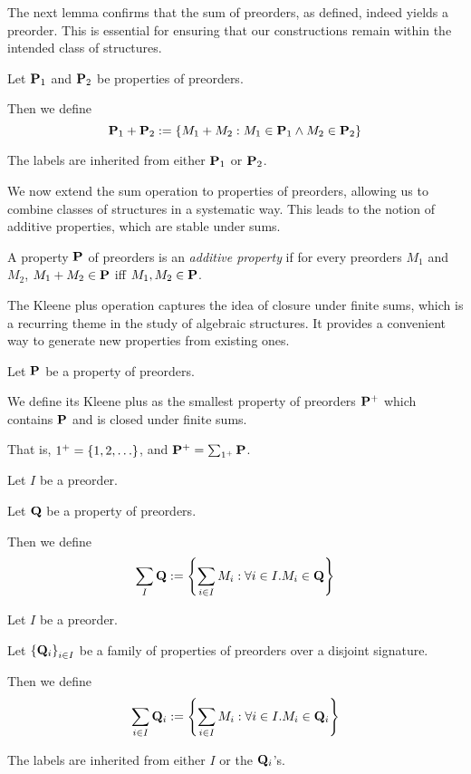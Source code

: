The next lemma confirms that the sum of preorders, as defined, indeed yields a preorder. This is essential for ensuring that our
constructions remain within the intended class of structures.

\begin{definition}
  Let $\mathbf{P}_1$ and $\mathbf{P}_2$ be properties of preorders.

  Then we define
  \[
    \mathbf{P}_1 + \mathbf{P}_2 := \left\{ {M_1 + M_2 : M_1 \in \mathbf{P}_1 \wedge M_2 \in \mathbf{P}_2} \right\}
  \]

  The labels are inherited from either $\mathbf{P}_1$ or $\mathbf{P}_2$.
\end{definition}

We now extend the sum operation to properties of preorders, allowing us to combine classes of structures in a systematic way.
This leads to the notion of additive properties, which are stable under sums.

\begin{definition}
  A property $\mathbf{P}$ of preorders is an \emph{additive property} if for every preorders $M_1$ and $M_2$,
  $M_1 + M_2 \in \mathbf{P}$ iff $M_1, M_2 \in \mathbf{P}$.
\end{definition}

The Kleene plus operation captures the idea of closure under finite sums, which is a recurring theme in the study of algebraic
structures. It provides a convenient way to generate new properties from existing ones.

\begin{definition}
  Let $\mathbf{P}$ be a property of preorders.

  We define its Kleene plus as the smallest property of preorders $\mathbf{P}^+$ which contains $\mathbf{P}$ and is closed under
  finite sums.

  That is, $1^+ = \left\{ {1, 2, \ldots} \right\}$, and $\mathbf{P}^+ = \sum_{1^+}{\mathbf{P}}$.
\end{definition}

\begin{definition}
  Let $I$ be a preorder.

  Let $\mathbf{Q}$ be a property of preorders.

  Then we define
  \[
    \sum_{I}{\mathbf{Q}} := \left\{ {\sum_{i \in I}{M_i} : \forall i \in I. M_i \in \mathbf{Q}} \right\}
  \]
\end{definition}

\begin{definition}
  Let $I$ be a preorder.

  Let $\left\{ {\mathbf{Q}_i} \right\}_{i \in I}$ be a family of properties of preorders
  over a disjoint signature.

  Then we define
  \[
    \sum_{i \in I}{\mathbf{Q}_i} := \left\{ {\sum_{i \in I}{M_i} : \forall i \in I. M_i \in \mathbf{Q}_i} \right\}
  \]

  The labels are inherited from either $I$ or the $\mathbf{Q}_i$'s.
\end{definition}

